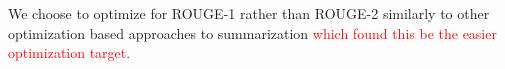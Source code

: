 %
We choose to optimize for ROUGE-1 rather than 
ROUGE-2 similarly to other optimization based approaches to summarization 
\textcolor{red}{
\cite{durrett2016learning,sipos2012large,nallapati2017summarunner} which found this
be the easier optimization target.}



